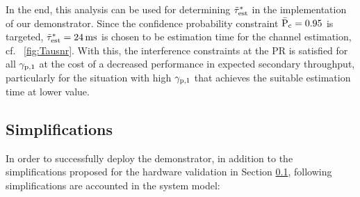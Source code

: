 In the end, this analysis can be used for determining $\tilde{\tau}^*_{\text{est}}$ in the implementation of our demonstrator. Since the confidence probability constraint $\bar{\text{P}}_{\text{c}} = 0.95$ is targeted, $\tilde{\tau}^*_{\text{est}} = \SI{24}{ms}$ is chosen to be estimation time for the channel estimation, cf. \figurename~\ref{fig:Tausnr}. With this, the interference constraints at the PR is satisfied for all ${\gamma}_{\text{p,1}}$ at the cost of a decreased performance in expected secondary throughput, particularly for the situation with high ${\gamma}_{\text{p,1}}$ that achieves the suitable estimation time at lower value.


\subsection{Simplifications}
\label{ssec:simp2}
In order to successfully deploy the demonstrator, in addition to the simplifications proposed for the hardware validation in Section \ref{ssec:simp2}, following simplifications are accounted in the system model: 

